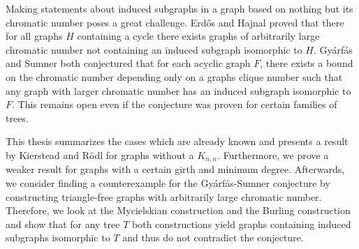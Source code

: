 Making statements about induced subgraphs in a graph based on nothing but its chromatic number poses a great challenge. Erd\H{o}s and Hajnal proved that there for all graphs $H$ containing a cycle there exists graphs of arbitrarily large chromatic number not containing an induced subgraph isomorphic to $H$. Gyárfás and Sumner both conjectured that for each acyclic graph $F$, there exists a bound on the chromatic number depending only on a graphs clique number such that any graph with larger chromatic number has an induced subgraph isomorphic to $F$. This remains open even if the conjecture was proven for certain families of trees.

This thesis summarizes the cases which are already known and presents a result by Kierstead and Rödl for graphs without a $K_{n,n}$. Furthermore, we prove a weaker result for graphs with a certain girth and minimum degree. Afterwards, we consider finding a counterexample for the Gyárfás-Sumner conjecture by constructing triangle-free graphs with arbitrarily large chromatic number. Therefore, we look at the Mycielskian construction and the Burling construction and show that for any tree $T$ both constructions yield graphs containing induced subgraphs isomorphic to $T$ and thus do not contradict the conjecture.